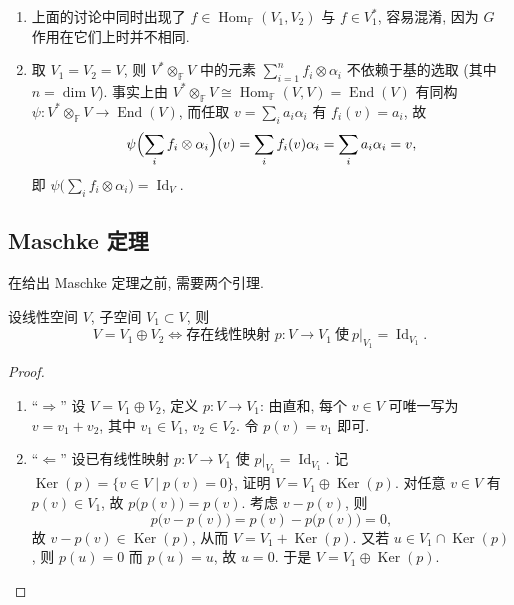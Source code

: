 \begin{remark}\label{rem:rep-trace}
\mbox{}\par\vspace{-0.2em}
\begin{enumerate}
\item 上面的讨论中同时出现了 $f\in\operatorname{Hom}_{\mathbb{F}}(V_1,V_2)$ 与 $f\in V_1^*$, 容易混淆, 因为 $G$ 作用在它们上时并不相同.

\item 取 $V_1=V_2=V$, 则 $V^*\otimes_{\mathbb{F}} V$ 中的元素 $\sum_{i=1}^{n}f_i\otimes\alpha_i$ 不依赖于基的选取
(其中 $n=\dim V$). 事实上由 $V^*\otimes_{\mathbb{F}} V\cong\operatorname{Hom}_{\mathbb{F}}(V,V)=\operatorname{End}(V)$ 有同构
$\psi\colon V^*\otimes_{\mathbb{F}} V\to\operatorname{End}(V)$, 而任取 $v=\sum_i a_i\alpha_i$ 有
$f_i(v)=a_i$, 故
\begin{equation*}
  \psi\Bigl(\sum_i f_i\otimes\alpha_i\Bigr)(v)=\sum_i f_i(v)\alpha_i=\sum_i a_i\alpha_i=v,
\end{equation*}
即 $\psi\bigl(\sum_i f_i\otimes\alpha_i\bigr)=\operatorname{Id}_V$.
\end{enumerate}
\end{remark}

\subsection{Maschke 定理}

在给出 Maschke 定理之前, 需要两个引理.

\begin{lemma}\label{lem:complement}
设线性空间 $V$, 子空间 $V_1\subset V$, 则
\begin{equation*}
  V=V_1\oplus V_2\iff \text{存在线性映射 } p\colon V\to V_1\ \text{使}\ p|_{V_1}=\operatorname{Id}_{V_1}.
\end{equation*}
\end{lemma}

\begin{proof}
\mbox{}\par\vspace{-0.2em}
\begin{enumerate}
\item ``$\Longrightarrow$'' 设 $V=V_1\oplus V_2$, 定义 $p\colon V\to V_1$: 由直和, 每个 $v\in V$ 可唯一写为 $v=v_1+v_2$,
其中 $v_1\in V_1$, $v_2\in V_2$. 令 $p(v)=v_1$ 即可.

\item ``$\Longleftarrow$'' 设已有线性映射 $p\colon V\to V_1$ 使 $p|_{V_1}=\operatorname{Id}_{V_1}$.
记 $\operatorname{Ker}(p)=\{v\in V\mid p(v)=0\}$, 证明 $V=V_1\oplus\operatorname{Ker}(p)$.
对任意 $v\in V$ 有 $p(v)\in V_1$, 故 $p\bigl(p(v)\bigr)=p(v)$.
考虑 $v-p(v)$, 则
\begin{equation*}
  p\bigl(v-p(v)\bigr)=p(v)-p\bigl(p(v)\bigr)=0,
\end{equation*}
故 $v-p(v)\in\operatorname{Ker}(p)$, 从而 $V=V_1+\operatorname{Ker}(p)$.
又若 $u\in V_1\cap\operatorname{Ker}(p)$, 则 $p(u)=0$ 而 $p(u)=u$, 故 $u=0$. 于是 $V=V_1\oplus\operatorname{Ker}(p)$.
\end{enumerate}
\end{proof}

